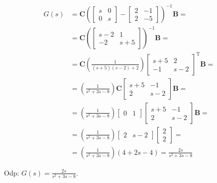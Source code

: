 \begin{align*}
G(s) & = \mathbf{C} \left(\begin{bmatrix} s & 0 \\ 0 & s \end{bmatrix} - \begin{bmatrix} 2 & -1 \\ 2 & -5 \end{bmatrix}\right)^{-1} \mathbf{B}=\\
& = \mathbf{C} \left(\begin{bmatrix} s-2 & 1 \\ -2 & s+5 \end{bmatrix}\right)^{-1} \mathbf{B} = \\
& = \mathbf{C} \left(\frac{1}{(s+5)(s-2)+2}\right) \begin{bmatrix} s+5 & 2 \\ -1 & s-2 \end{bmatrix}^\mathrm{T} \mathbf{B} = \\
& = \left(\frac{1}{s^2+3s-8}\right) \mathbf{C} \begin{bmatrix} s+5 & -1 \\ 2 & s-2 \end{bmatrix} \mathbf{B} = \\
& = \left(\frac{1}{s^2+3s-8}\right) \begin{bmatrix} 0 & 1 \end{bmatrix}\begin{bmatrix} s+5 & -1 \\ 2 & s-2 \end{bmatrix} \mathbf{B} = \\
& = \left(\frac{1}{s^2+3s-8}\right) \begin{bmatrix} 2 & s-2 \end{bmatrix}\begin{bmatrix} 2 \\ 2 \end{bmatrix} = \\
& = \left(\frac{1}{s^2+3s-8}\right) (4+2s-4) = \frac{2s}{s^2+3s-8}
\end{align*}

Odp: $G(s) = \frac{2s}{s^2+3s-8}$.

